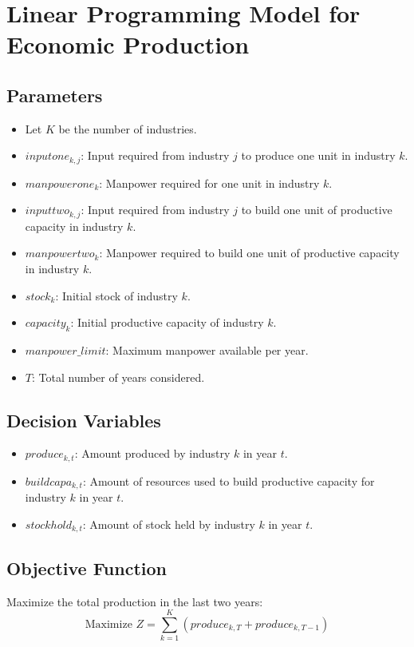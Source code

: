 \documentclass{article}
\begin{document}
\section*{Linear Programming Model for Economic Production}

\subsection*{Parameters}
\begin{itemize}
    \item Let \( K \) be the number of industries.
    \item \( inputone_{k, j} \): Input required from industry \( j \) to produce one unit in industry \( k \).
    \item \( manpowerone_{k} \): Manpower required for one unit in industry \( k \).
    \item \( inputtwo_{k, j} \): Input required from industry \( j \) to build one unit of productive capacity in industry \( k \).
    \item \( manpowertwo_{k} \): Manpower required to build one unit of productive capacity in industry \( k \).
    \item \( stock_{k} \): Initial stock of industry \( k \).
    \item \( capacity_{k} \): Initial productive capacity of industry \( k \).
    \item \( manpower\_limit \): Maximum manpower available per year.
    \item \( T \): Total number of years considered.
\end{itemize}

\subsection*{Decision Variables}
\begin{itemize}
    \item \( produce_{k, t} \): Amount produced by industry \( k \) in year \( t \).
    \item \( buildcapa_{k, t} \): Amount of resources used to build productive capacity for industry \( k \) in year \( t \).
    \item \( stockhold_{k, t} \): Amount of stock held by industry \( k \) in year \( t \).
\end{itemize}

\subsection*{Objective Function}
Maximize the total production in the last two years:
\[
\text{Maximize } Z = \sum_{k=1}^{K} (produce_{k, T} + produce_{k, T-1})
\]
\end{document}
